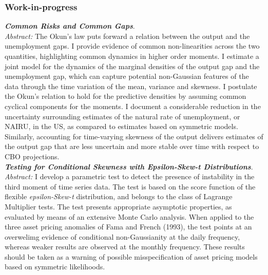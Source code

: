 \documentclass[a4paper,12pt]{article}
\begin{document}
\subsubsection*{Work-in-progress}
\textit{\textbf{Common Risks and Common Gaps}}.\\[.5em]
\textit{Abstract:} The Okun's law puts forward a relation between the output and the unemployment gaps. I provide evidence of common non-linearities across the two quantities, highlighting common dynamics in higher order moments. I estimate a joint model for the dynamics of the marginal densities of the output gap and the unemployment gap, which can capture potential non-Gaussian features of the data through the time variation of the mean, variance and skewness. I postulate the Okun's relation to hold for the predictive densities by assuming common cyclical components for the moments. I document a considerable reduction in the uncertainty surrounding estimates of the natural rate of unemployment, or NAIRU, in the US, as compared to estimates based on symmetric models. Similarly, accounting for time-varying skewness of the output delivers estimates of the output gap that are less uncertain and more stable over time with respect to CBO projections.\\[.5em]

\textit{\textbf{Testing for Conditional Skewness with Epsilon-Skew-t Distributions}}.\\[.5em]
\textit{Abstract:} I develop a parametric test to detect the presence of instability in the third moment of time series data. The test is based on the score function of the flexible \textit{epsilon-Skew-t} distribution, and belongs to the class of Lagrange Multiplier tests. The test presents appropriate asymptotic properties, as evaluated by means of an extensive Monte Carlo analysis. When applied to the three asset pricing anomalies of Fama and French (1993), the test points at an overwelimg evidence of conditional non-Gaussianity at the daily frequency, whereas weaker results are observed at the monthly frequency. These results should be taken as a warning of possible misspecification of asset pricing models based on symmetric likelihoods. \\[.5em]
\end{document}
